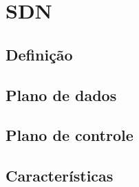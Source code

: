 \chapter{SDN}


\section{Definição}


\section{Plano de dados}


\section{Plano de controle}


\section{Características}

